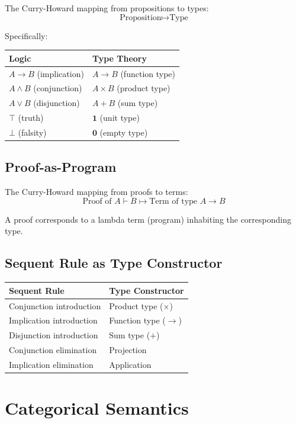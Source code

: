 The Curry-Howard mapping from propositions to types:
$$\text{Proposition} \mapsto \text{Type}$$

Specifically:
\begin{center}
\begin{tabular}{ll}
    \textbf{Logic} & \textbf{Type Theory} \\ \hline
    $A \to B$ (implication) & $A \to B$ (function type) \\
    $A \wedge B$ (conjunction) & $A \times B$ (product type) \\
    $A \vee B$ (disjunction) & $A + B$ (sum type) \\
    $\top$ (truth) & $\mathbf{1}$ (unit type) \\
    $\bot$ (falsity) & $\mathbf{0}$ (empty type)
\end{tabular}
\end{center}

\subsection*{Proof-as-Program}

The Curry-Howard mapping from proofs to terms:
$$\text{Proof of } A \vdash B \mapsto \text{Term of type } A \to B$$

A proof corresponds to a lambda term (program) inhabiting the corresponding type.

\subsection*{Sequent Rule as Type Constructor}

\begin{center}
\begin{tabular}{ll}
    \textbf{Sequent Rule} & \textbf{Type Constructor} \\ \hline
    Conjunction introduction & Product type ($\times$) \\
    Implication introduction & Function type ($\to$) \\
    Disjunction introduction & Sum type ($+$) \\
    Conjunction elimination & Projection \\
    Implication elimination & Application
\end{tabular}
\end{center}

\section*{Categorical Semantics}

